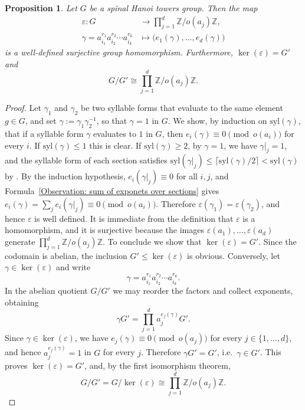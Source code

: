 \documentclass[11pt,leqno]{amsart}
\theoremstyle{plain}
\newtheorem{proposition}[proposition]{Proposition}
\newcommand{\Syl}{\mathrm{syl}}
\numberwithin{equation}{section}
\begin{document}
\begin{proposition}\label{epsilonmap}
	Let $G$ be a spinal Hanoi towers group. Then the map
	\begin{align*}
		\varepsilon: G&\longrightarrow \prod_{j=1}^d \mathbb Z/o(a_j)\mathbb Z,\\
		\gamma=a_{i_1}^{ r_1} a_{i_2}^{ r_2}\cdots a_{i_k}^{ r_k}&\longmapsto\bigl(e_1(\gamma), \ldots, e_d(\gamma)\bigr)
	\end{align*}
	is a well-defined surjective group homomorphism. Furthermore, $\ker(\varepsilon)=G'$ and 
	\[
	G/G'\cong \prod_{j=1}^d \mathbb Z/o(a_j)\mathbb Z.
	\]
\end{proposition}
\begin{proof}
	Let $\gamma_1$ and $\gamma_2$ be two syllable forms that evaluate to the same element $g\in G$,
	and set $\gamma:=\gamma_1\gamma_2^{-1}$, so that $\gamma=1$ in $G$.
	We show, by induction on $\Syl(\gamma)$, that if a syllable form $\gamma$ evaluates to $1$ in $G$, then $e_i(\gamma)\equiv 0\pmod{o(a_i)}$ for every $i$. If $\Syl(\gamma)\leq 1$ this is clear. If $\Syl(\gamma)\geq 2$, by  $\gamma=1$,  we have $\gamma|_j=1$, and the syllable form of each section satisfies $\Syl(\gamma|_j)\leq\lceil\Syl(\gamma)/2\rceil<\Syl(\gamma)$ by .
    By the induction hypothesis, $e_i(\gamma|_j)\equiv 0$ for all $i,j$, and Formula~\eqref{Observation: sum of exponets over sections} gives $e_i(\gamma)=\sum_{j} e_i(\gamma|_j)\equiv 0 \pmod{o(a_i)}$.
	Therefore $\varepsilon(\gamma_1)=\varepsilon(\gamma_2)$, and hence $\varepsilon$ is well defined.
	It is immediate from the definition that $\varepsilon$ is a homomorphism, and it is surjective
	because the images $\varepsilon(a_1),\dots,\varepsilon(a_d)$ generate
	$\prod_{j=1}^d \mathbb Z/o(a_j)\mathbb Z$.
    To conclude we show that $\ker(\varepsilon)=G'$. Since the codomain is abelian, the inclusion $G'\leq \ker(\varepsilon)$ is obvious.
    Conversely, let $\gamma\in \ker(\varepsilon)$ and write
    \[
\gamma=a_{i_1}^{r_1}a_{i_2}^{r_2}\cdots a_{i_k}^{r_k}.
   \]
   In the abelian quotient $G/G'$ we may reorder the factors and collect exponents, obtaining
   \[
   \gamma G'=\prod_{j=1}^d a_j^{e_j(\gamma)}G'.
   \]
   Since $\gamma\in \ker(\varepsilon)$, we have $e_j(\gamma)\equiv 0 \pmod{o(a_j)}$ for every
   $j\in\{1,\ldots,d\}$, and hence $a_j^{e_j(\gamma)}=1$ in $G$ for every $j$. Therefore
   $\gamma G'=G'$, i.e.\ $\gamma\in G'$. This proves $\ker(\varepsilon)=G'$, and,  by the first isomorphism theorem,
   \[
G/G'=G/\ker(\varepsilon)\cong\prod_{j=1}^d \mathbb Z/o(a_j)\mathbb Z.
   \]
\end{proof}
\end{document}
